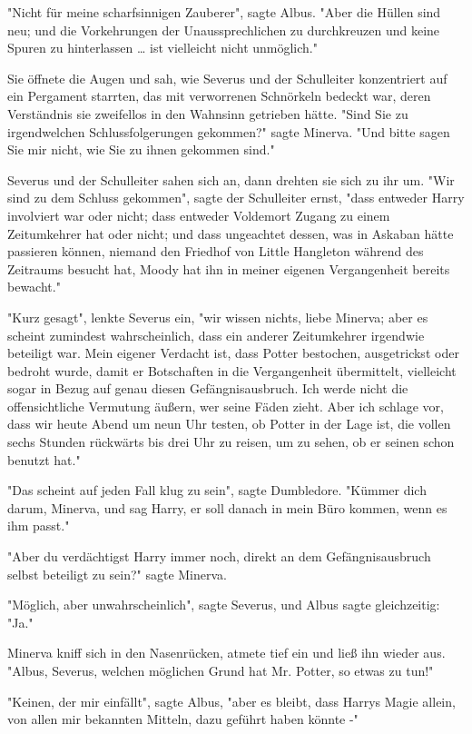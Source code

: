 {"Nicht für meine scharfsinnigen Zauberer", sagte Albus. "Aber die Hüllen sind neu; und die Vorkehrungen der Unaussprechlichen zu durchkreuzen und keine Spuren zu hinterlassen … ist vielleicht nicht unmöglich."

Sie öffnete die Augen und sah, wie Severus und der Schulleiter konzentriert auf ein Pergament starrten, das mit verworrenen Schnörkeln bedeckt war, deren Verständnis sie zweifellos in den Wahnsinn getrieben hätte. "Sind Sie zu irgendwelchen Schlussfolgerungen gekommen?" sagte Minerva. "Und bitte sagen Sie mir nicht, wie Sie zu ihnen gekommen sind."

Severus und der Schulleiter sahen sich an, dann drehten sie sich zu ihr um. "Wir sind zu dem Schluss gekommen", sagte der Schulleiter ernst, "dass entweder Harry involviert war oder nicht; dass entweder Voldemort Zugang zu einem Zeitumkehrer hat oder nicht; und dass ungeachtet dessen, was in Askaban hätte passieren können, niemand den Friedhof von Little Hangleton während des Zeitraums besucht hat, Moody hat ihn in meiner eigenen Vergangenheit bereits bewacht."

"Kurz gesagt", lenkte Severus ein, "wir wissen nichts, liebe Minerva; aber es scheint zumindest wahrscheinlich, dass ein anderer Zeitumkehrer irgendwie beteiligt war. Mein eigener Verdacht ist, dass Potter bestochen, ausgetrickst oder bedroht wurde, damit er Botschaften in die Vergangenheit übermittelt, vielleicht sogar in Bezug auf genau diesen Gefängnisausbruch. Ich werde nicht die offensichtliche Vermutung äußern, wer seine Fäden zieht. Aber ich schlage vor, dass wir heute Abend um neun Uhr testen, ob Potter in der Lage ist, die vollen sechs Stunden rückwärts bis drei Uhr zu reisen, um zu sehen, ob er seinen schon benutzt hat."

"Das scheint auf jeden Fall klug zu sein", sagte Dumbledore. "Kümmer dich darum, Minerva, und sag Harry, er soll danach in mein Büro kommen, wenn es ihm passt."

"Aber du verdächtigst Harry immer noch, direkt an dem Gefängnisausbruch selbst beteiligt zu sein?" sagte Minerva.

"Möglich, aber unwahrscheinlich", sagte Severus, und Albus sagte gleichzeitig: "Ja."

Minerva kniff sich in den Nasenrücken, atmete tief ein und ließ ihn wieder aus. "Albus, Severus, welchen möglichen Grund hat Mr. Potter, so etwas zu tun!"

"Keinen, der mir einfällt", sagte Albus, "aber es bleibt, dass Harrys Magie allein, von allen mir bekannten Mitteln, dazu geführt haben könnte -"

}
